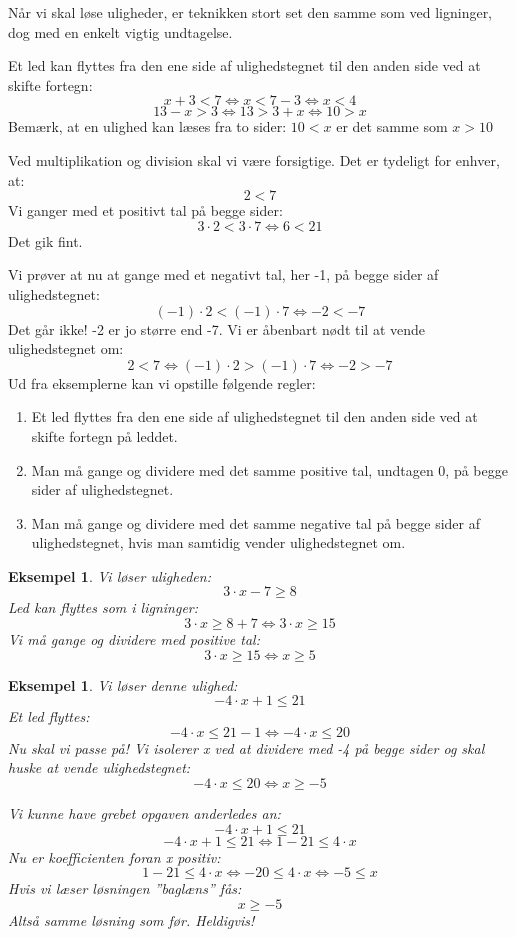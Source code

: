 \documentclass[12pt,oneside,a4paper]{article}
\newtheorem{eks}[thm]{Eksempel}
\begin{document}
Når vi skal løse uligheder, er teknikken stort set den samme som ved ligninger, dog med en enkelt vigtig undtagelse.

Et led kan flyttes fra den ene side af ulighedstegnet til den anden side ved at skifte fortegn:
$$
x+3<7 \Leftrightarrow x<7-3 \Leftrightarrow x<4
$$
$$
13-x>3 \Leftrightarrow 13>3+x \Leftrightarrow 10>x
$$
Bemærk, at en ulighed kan læses fra to sider:
$10 < x$ er det samme som $x > 10$

Ved multiplikation og division skal vi være forsigtige. Det er tydeligt for enhver, at:
$$
2<7
$$
Vi ganger med et positivt tal på begge sider:
$$
3 \cdot 2 <3 \cdot 7 \Leftrightarrow 6<21
$$
Det gik fint.

Vi prøver at nu at gange med et negativt tal, her -1, på begge sider af ulighedstegnet:
$$
(-1) \cdot 2 < (-1) \cdot 7 \Leftrightarrow -2<-7
$$
Det går ikke! -2 er jo større end -7. Vi er åbenbart nødt til at vende ulighedstegnet om:
$$
2<7 \Leftrightarrow (-1) \cdot 2 > (-1) \cdot 7 \Leftrightarrow -2>-7
$$
Ud fra eksemplerne kan vi opstille følgende regler:
\begin{enumerate}
    \item Et led flyttes fra den ene side af ulighedstegnet til den anden side ved at skifte fortegn på leddet.
    \item Man må gange og dividere med det samme positive tal, undtagen 0, på begge sider af ulighedstegnet.
    \item Man må gange og dividere med det samme negative tal på begge sider af ulighedstegnet, hvis man samtidig vender ulighedstegnet om.
\end{enumerate}

\begin{eks}
Vi løser uligheden:
$$
3 \cdot x - 7 \geq 8
$$
Led kan flyttes som i ligninger:
$$
3 \cdot x \geq 8+7 \Leftrightarrow 3 \cdot x \geq 15
$$
Vi må gange og dividere med positive tal:
$$
3 \cdot x \geq 15 \Leftrightarrow x \geq 5
$$
\end{eks}

\begin{eks}
Vi løser denne ulighed:
$$
-4 \cdot x + 1 \leq 21
$$
Et led flyttes:
$$
-4 \cdot x \leq 21 -1 \Leftrightarrow -4 \cdot x \leq 20
$$
Nu skal vi passe på! Vi isolerer x ved at dividere med -4 på begge sider og skal huske at vende ulighedstegnet:
$$
-4 \cdot x \leq 20 \Leftrightarrow x \geq-5
$$

Vi kunne have grebet opgaven anderledes an:
$$
-4 \cdot x + 1 \leq 21
$$
$$
-4 \cdot x + 1 \leq 21 \Leftrightarrow 1 - 21 \leq 4 \cdot x
$$
Nu er koefficienten foran x positiv:
$$
1-21 \leq 4 \cdot x \Leftrightarrow -20 \leq 4 \cdot x \Leftrightarrow -5 \leq x
$$
Hvis vi læser løsningen ”baglæns” fås:
$$
x \geq -5
$$
Altså samme løsning som før. Heldigvis!
\end{eks}
\end{document}
